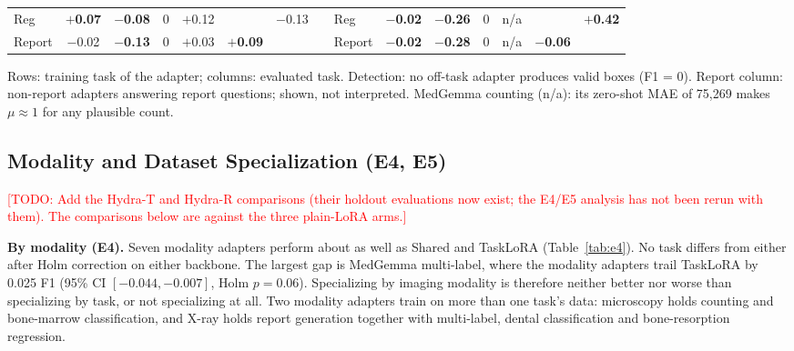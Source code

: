 \documentclass[journal,twoside,web]{ieeecolor}
\newcommand{\todo}[1]{\textcolor{red}{[TODO: #1]}}
\begin{document}
\begin{table}[!t]
\begin{tabular}{l*{6}{c}c l*{6}{c}}
Reg & \cellcolor[rgb]{0.954,0.969,0.987}\textbf{$+$0.07} & \cellcolor[rgb]{0.990,0.951,0.949}\textbf{$-$0.08} & 0 & \cellcolor[rgb]{0.922,0.946,0.978}$+$0.12 & \cellcolor[gray]{0.85} & \cellcolor[rgb]{0.984,0.921,0.917}$-$0.13 & & Reg & \cellcolor[rgb]{0.998,0.988,0.987}\textbf{$-$0.02} & \cellcolor[rgb]{0.969,0.842,0.834}\textbf{$-$0.26} & 0 & {\color[gray]{0.5}n/a} & \cellcolor[gray]{0.85} & \cellcolor[rgb]{0.726,0.811,0.921}\textbf{$+$0.42} \\
Report & \cellcolor[rgb]{0.998,0.988,0.987}$-$0.02 & \cellcolor[rgb]{0.984,0.921,0.917}\textbf{$-$0.13} & 0 & \cellcolor[rgb]{0.980,0.987,0.994}$+$0.03 & \cellcolor[rgb]{0.941,0.960,0.983}\textbf{$+$0.09} & \cellcolor[gray]{0.85} & & Report & \cellcolor[rgb]{0.998,0.988,0.987}\textbf{$-$0.02} & \cellcolor[rgb]{0.966,0.830,0.822}\textbf{$-$0.28} & 0 & {\color[gray]{0.5}n/a} & \cellcolor[rgb]{0.993,0.964,0.962}\textbf{$-$0.06} & \cellcolor[gray]{0.85} \\
\bottomrule
\end{tabular}
\vspace{2pt}

\parbox{\textwidth}{\footnotesize Rows: training task of the adapter; columns:
evaluated task. Detection: no off-task adapter produces valid boxes (F1 = 0).
Report column: non-report adapters answering report questions; shown, not
interpreted. MedGemma counting (n/a): its zero-shot MAE of 75{,}269 makes
$\mu\approx1$ for any plausible count.}
\end{table}

\subsection{Modality and Dataset Specialization (E4, E5)}
\todo{Add the Hydra-T and Hydra-R comparisons (their holdout evaluations now
exist; the E4/E5 analysis has not been rerun with them). The comparisons below
are against the three plain-LoRA arms.}

\textbf{By modality (E4).} Seven modality adapters perform about as well as
Shared and TaskLoRA (Table~\ref{tab:e4}). No task differs from either after
Holm correction on either backbone. The largest gap is MedGemma multi-label,
where the modality adapters trail TaskLoRA by 0.025 F1 (95\% CI
$[-0.044,-0.007]$, Holm $p=0.06$). Specializing by imaging modality is
therefore neither better nor worse than specializing by task, or not
specializing at all. Two modality adapters train on more than one task's
data: microscopy holds counting and bone-marrow classification, and X-ray
holds report generation together with multi-label, dental classification
and bone-resorption regression.
\end{document}
